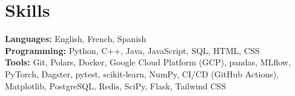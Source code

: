 \documentclass[a4, 11pt]{article}  %
\begin{document}
\resumeSubHeadingListEnd
\vspace{-18.5pt}

\section{Skills}

\vspace{1pt}

\begin{itemize}[leftmargin=0in, label={}]
    \small{
        \item{
                    \textbf{Languages:} {English, French, Spanish}\\
                    \textbf{Programming:} {Python, C++, Java, JavaScript, SQL, HTML, CSS}\\
                    \textbf{Tools:} {Git, Polars, Docker, Google Cloud Platform (GCP), pandas, MLﬂow, PyTorch, Dagster, pytest, scikit-learn, NumPy, CI/CD (GitHub Actions), Matplotlib, PostgreSQL, Redis, SciPy, Flask, Tailwind CSS}
              }
    }
\end{itemize}
\end{document}
